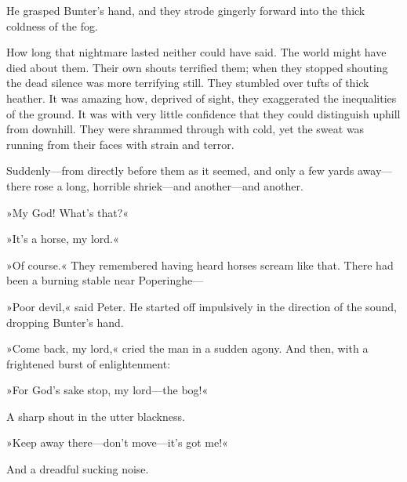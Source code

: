 He grasped Bunter's hand, and they strode gingerly forward into the thick coldness of the fog.

How long that nightmare lasted neither could have said. The world might have died about them. Their own shouts terrified them; when they stopped shouting the dead silence was more terrifying still. They stumbled over tufts of thick heather. It was amazing how, deprived of sight, they exaggerated the inequalities of the ground. It was with very little confidence that they could distinguish uphill from downhill. They were shrammed through with cold, yet the sweat was running from their faces with strain and terror.

Suddenly\allowbreak---\allowbreak from directly before them as it seemed, and only a few yards away\allowbreak---\allowbreak there rose a long, horrible shriek\allowbreak---\allowbreak and another\allowbreak---\allowbreak and another.

»My God! What's that?«

»It's a horse, my lord.«

»Of course.« They remembered having heard horses scream like that. There had been a burning stable near Poperinghe---

»Poor devil,« said Peter. He started off impulsively in the direction of the sound, dropping Bunter's hand.

»Come back, my lord,« cried the man in a sudden agony. And then, with a frightened burst of enlightenment:

»For God's sake stop, my lord\allowbreak---\allowbreak the bog!«

A sharp shout in the utter blackness.

»Keep away there\allowbreak---\allowbreak don't move\allowbreak---\allowbreak it's got me!«

And a dreadful sucking noise.

